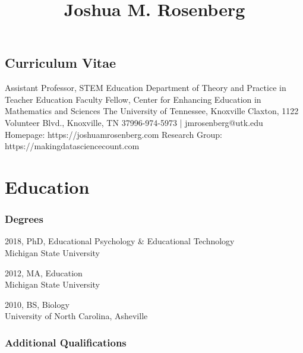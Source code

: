 \documentclass[
  14,
]{article}
\title{Joshua M. Rosenberg\vspace{-3em}}
\author{}
\date{}
\begin{document}
\maketitle
\thispagestyle{empty}

\begin{center}

\section{Curriculum Vitae}\label{curriculum-vitae}

Assistant Professor, STEM Education\linebreak
Department of Theory and Practice in Teacher Education\linebreak
Faculty Fellow, Center for Enhancing Education in Mathematics and Sciences\linebreak
The University of Tennessee, Knoxville Claxton, 1122 Volunteer Blvd., Knoxville, TN 37996-974-5973 | jmrosenberg@utk.edu\linebreak
Homepage: https://joshuamrosenberg.com\linebreak
Research Group: https://makingdatasciencecount.com\linebreak  
\end{center}

\hypertarget{education}{%
\section{Education}\label{education}}

\hypertarget{degrees}{%
\subsubsection{Degrees}\label{degrees}}

2018, PhD, Educational Psychology \& Educational Technology\\
Michigan State University

2012, MA, Education\\
Michigan State University

2010, BS, Biology\\
University of North Carolina, Asheville

\hypertarget{additional-qualifications}{%
\subsubsection{Additional
Qualifications}\label{additional-qualifications}}
\end{document}
